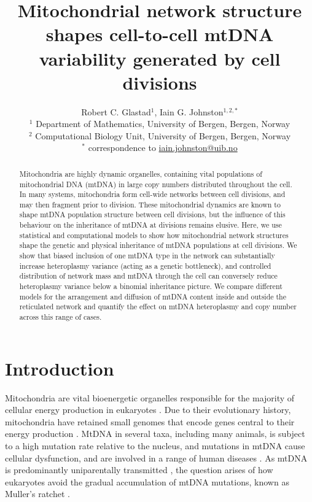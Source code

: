 \documentclass{article}
\title{Mitochondrial network structure shapes cell-to-cell mtDNA variability generated by cell divisions}
\author{Robert C. Glastad${}^1$, Iain G. Johnston${}^{1,2,*}$ \\ \footnotesize ${}^1$ Department of Mathematics, University of Bergen, Bergen, Norway \\ \footnotesize ${}^2$ Computational Biology Unit, University of Bergen, Bergen, Norway \\ \footnotesize ${}^*$ correspondence to \url{iain.johnston@uib.no}}
\date{}
\begin{document}
\maketitle
\begin{abstract}
Mitochondria are highly dynamic organelles, containing vital populations of mitochondrial DNA (mtDNA) in large copy numbers distributed throughout the cell. In many systems, mitochondria form cell-wide networks between cell divisions, and may then fragment prior to division. These mitochondrial dynamics are known to shape mtDNA population structure between cell divisions, but the influence of this behaviour on the inheritance of mtDNA at divisions remains elusive. Here, we use statistical and computational models to show how mitochondrial network structures shape the genetic and physical inheritance of mtDNA populations at cell divisions. We show that biased inclusion of one mtDNA type in the network can substantially increase heteroplasmy variance (acting as a genetic bottleneck), and controlled distribution of network mass and mtDNA through the cell can conversely reduce heteroplasmy variance below a binomial inheritance picture. We compare different models for the arrangement and diffusion of mtDNA content inside and outside the reticulated network and quantify the effect on mtDNA heteroplasmy and copy number across this range of cases.
\end{abstract}
\section{Introduction}
Mitochondria are vital bioenergetic organelles responsible for the majority of cellular energy production in eukaryotes \citep{spinelli2018multifaceted, smith2015mitochondrial}. Due to their evolutionary history, mitochondria have retained small genomes \citep{martin1998gene, gray2001origin, roger2017origin} that encode genes central to their energy production \citep{johnston2016evolutionary, allen2017corr}. MtDNA in several taxa, including many animals, is subject to a high mutation rate relative to the nucleus, and mutations in mtDNA cause cellular dysfunction, and are involved in a range of human diseases \citep{wallace2013mitochondrial, burr2018mitochondrial}. As mtDNA is predominantly uniparentally transmitted \citep{greiner2015most}, the question arises of how eukaryotes avoid the gradual accumulation of mtDNA mutations, known as Muller's ratchet \citep{muller1964relation}. 
\end{document}
